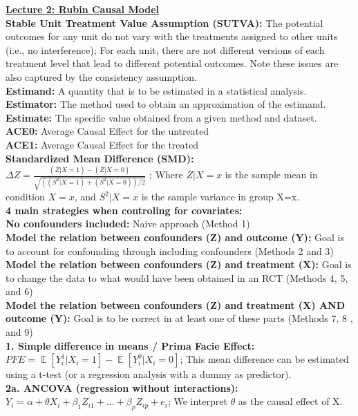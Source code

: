 \documentclass[a4paper,7pt,landscape]{extarticle}
\DeclareMathOperator*{\E}{\mathbb{E}} %
\begin{document}
\begin{multicols}{3}
\begin{boxA}
\underline{\textbf{Lecture 2: Rubin Causal Model}}\\
\textbf{Stable Unit Treatment Value Assumption (SUTVA):} The potential outcomes for any unit do not vary with the treatments assigned to other units (i.e., no interference); For each unit, there are not different versions of each treatment level that lead to different potential outcomes. Note these issues are also captured by the consistency assumption.\\
\textbf{Estimand:} A quantity that is to be estimated in a statistical analysis.\\
\textbf{Estimator:} The method used to obtain an approximation of the estimand.\\
\textbf{Estimate:} The specific value obtained from a given method and dataset.\\
\textbf{ACE0:} Average Causal Effect for the untreated\\
\textbf{ACE1:} Average Causal Effect for the treated\\
\textbf{Standardized Mean Difference (SMD):} \\$\Delta Z = \frac{(\overline{Z} | X = 1)-(\overline{Z} | X = 0)}{\sqrt{((S^2 | X = 1)+(S^2 | X = 0)) / 2}}$ ; Where $Z|X=x$ is the sample mean in condition $X=x$, and $S^2|X=x$ is the sample variance in group X=x.\\
\textbf{4 main strategies when controling for covariates:}\\
\textbf{No confounders included:} Naive approach (Method 1)\\
\textbf{Model the relation between confounders (Z) and outcome (Y):} Goal is to account for confounding through including confounders (Methods 2 and 3)\\
\textbf{Model the relation between confounders (Z) and treatment (X):} Goal is to change the data to what would have been obtained in an RCT (Methods 4, 5, and 6)\\
\textbf{Model the relation between confounders (Z) and treatment (X) AND outcome (Y):} Goal is to be correct in at least one of these parts (Methods 7, 8 , and 9)\\
\textbf{1. Simple difference in means / Prima Facie Effect:} $PFE = \E [Y_i^1|X_i=1]- \E [Y_i^0|X_i=0]$; This mean difference can be estimated using a t-test (or a regression analysis with a dummy as predictor).\\
\textbf{2a. ANCOVA (regression without interactions):} $Y_i = \alpha+\theta X_i+ \beta_1 Z_{i1}+…+\beta_p Z_{ip}+e_i$; We interpret $\theta$ as the causal effect of X.\\

\end{boxA}
\end{multicols}
\end{document}
